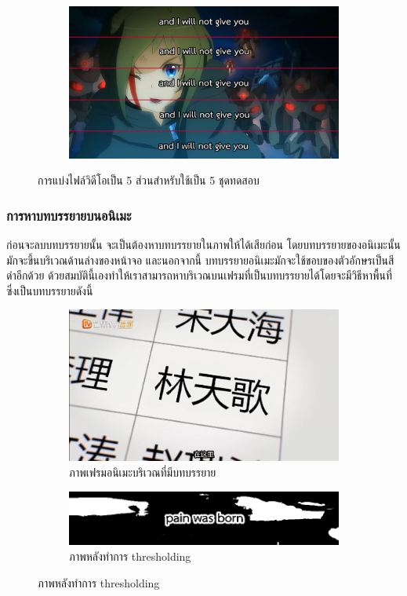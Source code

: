 \documentclass[hidelinks, a4paper,12pt]{article}
\numberwithin{equation}{section}							%
\numberwithin{equation}{section}
\begin{document}
{	\begin{figure}[H]
		\centering
		\begin{subfigure}{0.8\linewidth}
			\centering
			\includegraphics[width=0.8\linewidth]{images/inori-subbed-preview.png}
		\end{subfigure}
		\caption{การแบ่งไฟล์วิดีโอเป็น 5 ส่วนสำหรับใช้เป็น 5 ชุดทดสอบ}
	\end{figure}
	
	\subsubsection{การหาบทบรรยายบนอนิเมะ}	
	\hspace{1cm}ก่อนจะลบบทบรรยายนั้น จะเป็นต้องหาบทบรรยายในภาพให้ได้เสียก่อน โดยบทบรรยายของอนิเมะนั้น มักจะขึ้นบริเวณด้านล่างของหน้าจอ และนอกจากนี้ บทบรรยายอนิเมะมักจะใช้ขอบของตัวอักษรเป็นสีดำอีกด้วย ด้วยสมบัตินี้เองทำให้เราสามารถหาบริเวณบนเฟรมที่เป็นบทบรรยายได้โดยจะมีวิธีหาพื้นที่ซึ่งเป็นบทบรรยายดังนี้
	
	\begin{figure}[H]
		\begin{subfigure}{0.4\linewidth}
			\centering
			\includegraphics[width=0.8\linewidth]{images/subtitle_detection/detection-original.png}
			\caption{ภาพเฟรมอนิเมะบริเวณที่มีบทบรรยาย}
		\end{subfigure}
		\begin{subfigure}{0.4\linewidth}
			\centering
			\includegraphics[width=0.8\linewidth]{images/subtitle_detection/detection-threshold.png}
			\caption{ภาพหลังทำการ thresholding}
		\end{subfigure}
	\end{figure}
	
}
\end{document}

